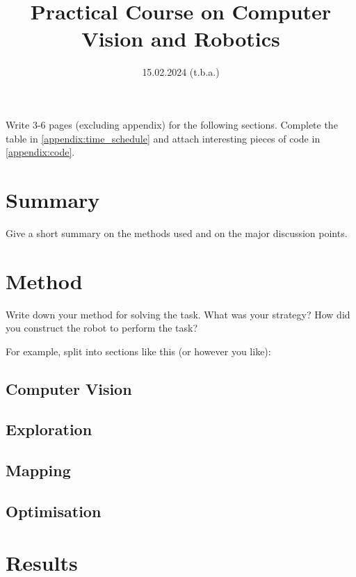 \documentclass[
	12pt,
]{sty/report_style}
\title{Practical Course on Computer Vision and Robotics} %
\date{15.02.2024 (t.b.a.)} %
\institute{Georg-August-Universität Göttingen \\ Drittes Physikalisches Institut} %
\begin{document}
\maketitle

\begin{problem}
    Write 3-6 pages (excluding appendix) for the following sections. Complete the table in \cref{appendix:time_schedule} and attach interesting pieces of code in \cref{appendix:code}.
\end{problem}

\section{Summary}

Give a short summary on the methods used and on the major discussion points.

\section{Method}

Write down your method for solving the task. What was your strategy? How did you construct the robot to perform the task?

For example, split into sections like this (or however you like):

\subsection{Computer Vision}

\subsection{Exploration}

\subsection{Mapping}

\subsection{Optimisation}

\section{Results}
\end{document}
